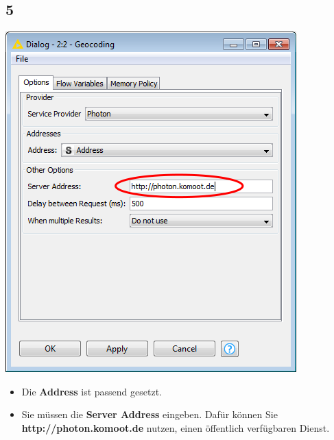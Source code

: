 \documentclass{beamer}
\begin{document}
\subsection{5}
\begin{frame}
	\begin{center}
  		\includegraphics[height=0.6\textheight]{5.png}
	\end{center}
	\begin{itemize}
        \item Die \textbf{Address} ist passend gesetzt.
		\item Sie müssen die \textbf{Server Address} eingeben. Dafür können Sie \textbf{http://photon.komoot.de} nutzen, einen öffentlich verfügbaren Dienst. 
	\end{itemize}
\end{frame}
\end{document}
